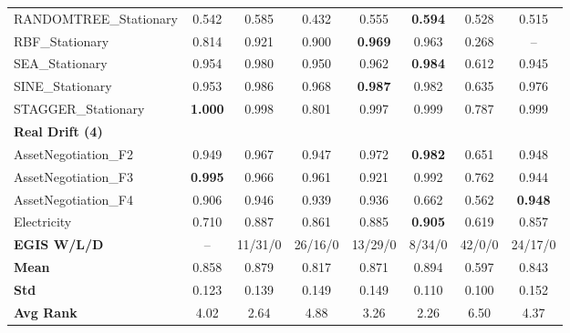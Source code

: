 \begin{table}[ht]
\begin{tabular}{l|ccccccc}
RANDOMTREE\_Stationary & 0.542 & 0.585 & 0.432 & 0.555 & \textbf{0.594} & 0.528 & 0.515 \\
RBF\_Stationary & 0.814 & 0.921 & 0.900 & \textbf{0.969} & 0.963 & 0.268 & -- \\
SEA\_Stationary & 0.954 & 0.980 & 0.950 & 0.962 & \textbf{0.984} & 0.612 & 0.945 \\
SINE\_Stationary & 0.953 & 0.986 & 0.968 & \textbf{0.987} & 0.982 & 0.635 & 0.976 \\
STAGGER\_Stationary & \textbf{1.000} & 0.998 & 0.801 & 0.997 & 0.999 & 0.787 & 0.999 \\
\multicolumn{8}{l}{\textbf{Real Drift (4)}} \\
AssetNegotiation\_F2 & 0.949 & 0.967 & 0.947 & 0.972 & \textbf{0.982} & 0.651 & 0.948 \\
AssetNegotiation\_F3 & \textbf{0.995} & 0.966 & 0.961 & 0.921 & 0.992 & 0.762 & 0.944 \\
AssetNegotiation\_F4 & 0.906 & 0.946 & 0.939 & 0.936 & 0.662 & 0.562 & \textbf{0.948} \\
Electricity & 0.710 & 0.887 & 0.861 & 0.885 & \textbf{0.905} & 0.619 & 0.857 \\
\midrule
\textbf{EGIS W/L/D} & -- & 11/31/0 & 26/16/0 & 13/29/0 & 8/34/0 & 42/0/0 & 24/17/0 \\
\textbf{Mean} & 0.858 & 0.879 & 0.817 & 0.871 & 0.894 & 0.597 & 0.843 \\
\textbf{Std} & 0.123 & 0.139 & 0.149 & 0.149 & 0.110 & 0.100 & 0.152 \\
\textbf{Avg Rank} & 4.02 & 2.64 & 4.88 & 3.26 & 2.26 & 6.50 & 4.37 \\
\bottomrule
\end{tabular}
\end{table}